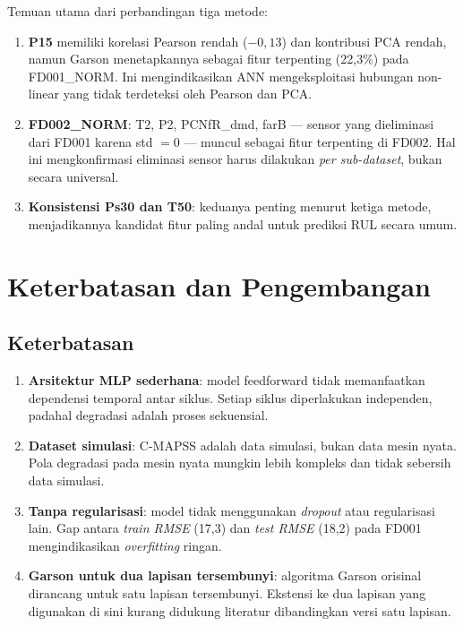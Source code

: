 \documentclass[11pt,a4paper]{article}
\begin{document}
Temuan utama dari perbandingan tiga metode:

\begin{enumerate}[noitemsep]
  \item \textbf{P15} memiliki korelasi Pearson rendah ($-0{,}13$) dan kontribusi
    PCA rendah, namun Garson menetapkannya sebagai fitur terpenting (22,3\%) pada
    FD001\_NORM. Ini mengindikasikan ANN mengeksploitasi hubungan non-linear
    yang tidak terdeteksi oleh Pearson dan PCA.

  \item \textbf{FD002\_NORM}: T2, P2, PCNfR\_dmd, farB --- sensor yang dieliminasi
    dari FD001 karena std $= 0$ --- muncul sebagai fitur terpenting di FD002.
    Hal ini mengkonfirmasi eliminasi sensor harus dilakukan \textit{per sub-dataset},
    bukan secara universal.

  \item \textbf{Konsistensi Ps30 dan T50}: keduanya penting menurut ketiga metode,
    menjadikannya kandidat fitur paling andal untuk prediksi RUL secara umum.
\end{enumerate}

\section{Keterbatasan dan Pengembangan}

\subsection{Keterbatasan}

\begin{enumerate}[noitemsep]
  \item \textbf{Arsitektur MLP sederhana}: model feedforward tidak memanfaatkan
    dependensi temporal antar siklus. Setiap siklus diperlakukan independen,
    padahal degradasi adalah proses sekuensial.
  \item \textbf{Dataset simulasi}: C-MAPSS adalah data simulasi, bukan data
    mesin nyata. Pola degradasi pada mesin nyata mungkin lebih kompleks dan
    tidak sebersih data simulasi.
  \item \textbf{Tanpa regularisasi}: model tidak menggunakan \textit{dropout}
    atau regularisasi lain. Gap antara \textit{train RMSE} (17,3) dan
    \textit{test RMSE} (18,2) pada FD001 mengindikasikan \textit{overfitting}
    ringan.
  \item \textbf{Garson untuk dua lapisan tersembunyi}: algoritma Garson
    orisinal dirancang untuk satu lapisan tersembunyi. Ekstensi ke dua
    lapisan yang digunakan di sini kurang didukung literatur dibandingkan
    versi satu lapisan.
\end{enumerate}
\end{document}

